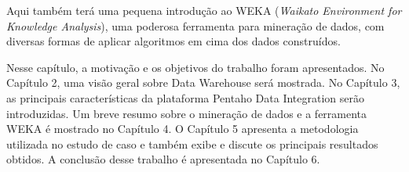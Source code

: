 Aqui também terá uma pequena introdução ao WEKA (\textit{Waikato Environment for Knowledge Analysis}), uma poderosa ferramenta para mineração de dados, com diversas formas de aplicar algoritmos em cima dos dados construídos.

Nesse capítulo, a motivação e os objetivos do trabalho foram apresentados. No Capítulo 2, uma visão geral sobre Data Warehouse será mostrada. No Capítulo 3, as principais características da plataforma Pentaho Data Integration serão introduzidas. Um breve resumo sobre o mineração de dados e a ferramenta WEKA é mostrado no Capítulo 4. O Capítulo 5 apresenta a metodologia utilizada no estudo de caso e também exibe e discute os principais resultados obtidos. A conclusão desse trabalho é apresentada no Capítulo 6.
